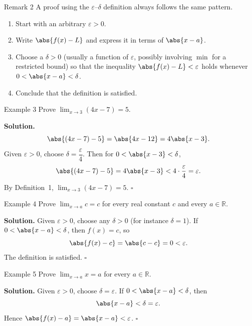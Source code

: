 \begin{remarkbox}{Remark 2}
A proof using the \(\varepsilon\)--\(\delta\) definition always follows the same pattern.
\begin{enumerate}
    \item Start with an arbitrary \(\varepsilon > 0\).
    \item Write \(\abs{f(x)-L}\) and express it in terms of \(\abs{x-a}\).
    \item Choose a \(\delta > 0\) (usually a function of \(\varepsilon\), possibly involving \(\min\) for a restricted bound) so that the inequality \(\abs{f(x)-L}<\varepsilon\) holds whenever \(0<\abs{x-a}<\delta\).
    \item Conclude that the definition is satisfied.
\end{enumerate}
\end{remarkbox}

\begin{examplebox}{Example 3}
Prove \(\displaystyle\lim_{x \to 3} (4x - 7) = 5\).

\medskip
\textbf{Solution.}
\[
\abs{(4x - 7) - 5} = \abs{4x - 12} = 4\abs{x - 3}.
\]
Given \(\varepsilon > 0\), choose \(\delta = \dfrac{\varepsilon}{4}\). Then for \(0 < \abs{x - 3} < \delta\),
\[
\abs{(4x - 7) - 5} = 4\abs{x - 3} < 4 \cdot \frac{\varepsilon}{4} = \varepsilon.
\]
By Definition~1, \(\displaystyle\lim_{x \to 3} (4x - 7) = 5\). \(\square\)
\end{examplebox}

\begin{examplebox}{Example 4}
Prove \(\displaystyle\lim_{x \to a} c = c\) for every real constant \(c\) and every \(a \in \mathbb{R}\).

\medskip
\textbf{Solution.}
Given \(\varepsilon > 0\), choose any \(\delta > 0\) (for instance \(\delta = 1\)). If \(0 < \abs{x - a} < \delta\), then \(f(x) = c\), so
\[
\abs{f(x) - c} = \abs{c - c} = 0 < \varepsilon.
\]
The definition is satisfied. \(\square\)
\end{examplebox}

\begin{examplebox}{Example 5}
Prove \(\displaystyle\lim_{x \to a} x = a\) for every \(a \in \mathbb{R}\).

\medskip
\textbf{Solution.}
Given \(\varepsilon > 0\), choose \(\delta = \varepsilon\). If \(0 < \abs{x - a} < \delta\), then
\[
\abs{x - a} < \delta = \varepsilon.
\]
Hence \(\abs{f(x) - a} = \abs{x - a} < \varepsilon\). \(\square\)
\end{examplebox}

